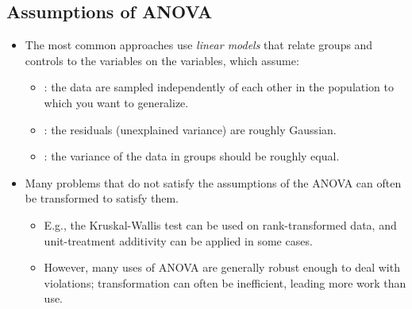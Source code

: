 \begin{itemize}
  \subsection{Assumptions of ANOVA}
  \begin{itemize}
    \item The most common approaches use \emph{linear models} that relate groups and controls to the  variables on the  variables, which assume:
      \begin{itemize}
        \item {}: the data are sampled independently of each other in the population to which you want to generalize.
        \item {}: the residuals (unexplained variance) are roughly Gaussian.
        \item {}: the variance of the data in groups should be roughly equal.
      \end{itemize}
    \item Many problems that do not satisfy the assumptions of the ANOVA can often be transformed to satisfy them. 
      \begin{itemize}
        \item E.g., the Kruskal-Wallis test can be used on rank-transformed data, and unit-treatment additivity can be applied in some cases.
        \item However, many uses of ANOVA are generally robust enough to deal with violations; transformation can often be inefficient, leading more work than use.
      \end{itemize}
  \end{itemize}
\end{itemize}

